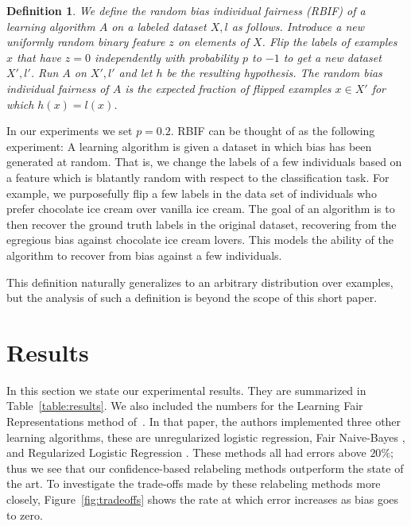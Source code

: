 \documentclass{article}
\newtheorem{definition}{Definition}
\begin{document}
\begin{definition}
We define the \emph{random bias individual fairness} (RBIF) of a learning
algorithm $A$ on a labeled dataset $X,l$ as follows. Introduce a new uniformly
random binary feature $z$ on elements of $X$. Flip the labels of examples $x$
that have $z=0$ independently with probability $p$ to $-1$ to get a new dataset
$X', l'$. Run $A$ on $X', l'$ and let $h$ be the resulting hypothesis. The
random bias individual fairness of $A$ is the expected fraction of flipped
examples $x \in X'$ for which $h(x) = l(x)$.  
\end{definition}

In our experiments we set $p = 0.2$.  RBIF can be thought of as the following
experiment:  A learning algorithm is given a dataset in which bias has been
generated at random.  That is, we change the labels of a few
individuals based on a feature which is blatantly random with respect to the
classification task.  For example, we purposefully flip a few labels in the
data set of individuals who prefer chocolate ice cream over vanilla ice cream.
The goal of an algorithm is to then recover the ground truth labels in the
original dataset, recovering from the egregious bias against chocolate ice
cream lovers.  This models the ability of the algorithm to recover from bias
against a few individuals.

This definition naturally generalizes to an arbitrary distribution over
examples, but the analysis of such a definition is beyond the scope of this
short paper.

\section{Results} \label{sec:results}

In this section we state our experimental results. They are summarized in
Table~\ref{table:results}. We also included the numbers for the Learning Fair
Representations method of~\citet{ZemelWSPD13}. In that paper, the authors
implemented three other learning algorithms, these are unregularized logistic
regression, Fair Naive-Bayes \citep{KamiranC09}, and Regularized Logistic
Regression \citep{KamashimaAS11}. These methods all had errors above $20\%$;
thus we see that our confidence-based relabeling methods outperform the state of
the art.  To investigate the trade-offs made by these relabeling methods more
closely, Figure~\ref{fig:tradeoffs} shows the rate at which error increases as
bias goes to zero.
\end{document}
